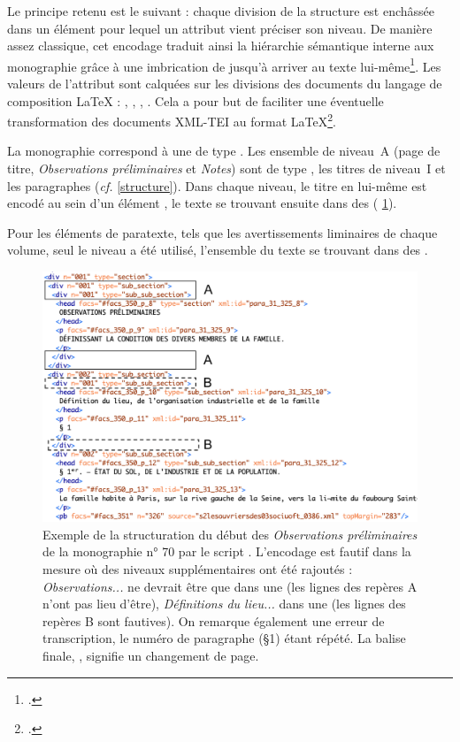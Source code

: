 Le principe retenu est le suivant : chaque division de la structure est enchâssée dans un élément  pour lequel un attribut  vient préciser son niveau. De manière assez classique, cet encodage traduit ainsi la hiérarchie sémantique interne aux monographie grâce à une imbrication de  jusqu'à arriver au texte lui-même\footcite[p. 117]{clerice}. Les valeurs de l'attribut  sont calquées sur les divisions des documents du langage de composition \LaTeX{} : , , , . Cela a pour but de faciliter une éventuelle transformation des documents XML-TEI au format \LaTeX\footcite[p. 52]{chague2}.

La monographie correspond à une  de type . Les ensemble de niveau~A (page de titre, \textit{Observations préliminaires} et \textit{Notes}) sont de type , les titres de niveau~I  et les paragraphes  (\textit{cf.} \ann{} \ref{structure}). Dans chaque niveau, le titre en lui-même est encodé au sein d'un élément , le texte se trouvant ensuite dans des  (\fig{} \ref{fig:ex_structure}).

Pour les éléments de paratexte, tels que les avertissements liminaires de chaque volume, seul le niveau  a été utilisé, l'ensemble du texte se trouvant dans des .

\begin{figure}[t]
    \centering
    \includegraphics[width=16cm]{img/ex_structure.png}
    \caption{Exemple de la structuration du début des \textit{Observations préliminaires} de la monographie n° 70 par le script \lse. L'encodage est fautif dans la mesure où des niveaux supplémentaires ont été rajoutés : \textit{Observations...} ne devrait être que dans une  (les lignes des repères A n'ont pas lieu d'être), \textit{Définitions du lieu...} dans une  (les lignes des repères B sont fautives). On remarque également une erreur de transcription, le numéro de paragraphe (§1) étant répété. La balise finale, , signifie un changement de page.}
    \label{fig:ex_structure}
\end{figure}

